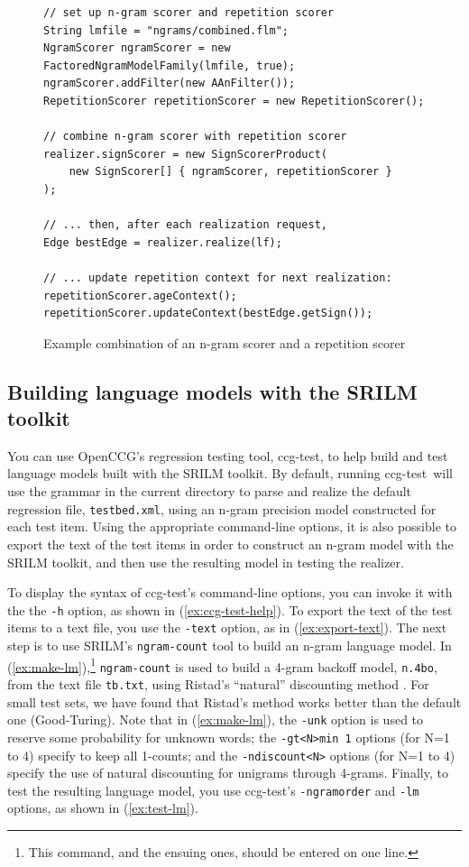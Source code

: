 \documentclass[11pt]{article}
\newcommand{\occg}{OpenCCG}
\newcommand{\ccgtest}{\textsf{ccg-test}}
\newcommand{\code}[1]{\texttt{#1}} %
\newcommand{\eref}[2][]{(\ref{ex:#2}#1)} %
\begin{document}
\begin{figure}%
\begin{center}
\begin{lstlisting}
// set up n-gram scorer and repetition scorer
String lmfile = "ngrams/combined.flm";
NgramScorer ngramScorer = new FactoredNgramModelFamily(lmfile, true);
ngramScorer.addFilter(new AAnFilter());
RepetitionScorer repetitionScorer = new RepetitionScorer();

// combine n-gram scorer with repetition scorer
realizer.signScorer = new SignScorerProduct(
    new SignScorer[] { ngramScorer, repetitionScorer }
);

// ... then, after each realization request, 
Edge bestEdge = realizer.realize(lf);

// ... update repetition context for next realization:
repetitionScorer.ageContext();
repetitionScorer.updateContext(bestEdge.getSign());
\end{lstlisting}
\caption{Example combination of an n-gram scorer and a repetition scorer}
\label{rep-scorer}
\end{center}
\end{figure}

\subsection{Building language models with the SRILM toolkit}
\label{using-srilm}

You can use \occg's regression testing tool, \ccgtest, to help build and
test language models built with the SRILM toolkit. By default, running
\ccgtest\ will use the grammar in the current directory to parse and
realize the default regression file, \code{testbed.xml}, using an n-gram
precision model constructed for each test item. Using the appropriate
command-line options, it is also possible to export the text of the test
items in order to construct an n-gram model with the SRILM toolkit, and
then use the resulting model in testing the realizer.

To display the syntax of \ccgtest's command-line options, you can invoke
it with the the \code{-h} option, as shown in \eref{ccg-test-help}. To
export the text of the test items to a text file, you use the
\code{-text} option, as in \eref{export-text}. The next step is to use
SRILM's \code{ngram-count} tool to build an n-gram language model. In
\eref{make-lm},\footnote{This command, and the ensuing ones, should be
entered on one line.} \code{ngram-count} is used to build a 4-gram
backoff model, \code{n.4bo}, from the text file \code{tb.txt}, using
Ristad's ``natural'' discounting method \cite{Ristad:1995}. For small
test sets, we have found that Ristad's method works better than the
default one (Good-Turing). Note that in \eref{make-lm}, the \code{-unk}
option is used to reserve some probability for unknown words; the
\code{-gt<N>min 1} options (for N=1 to 4) specify to keep all 1-counts;
and the \code{-ndiscount<N>} options (for N=1 to 4) specify the use of
natural discounting for unigrams through 4-grams. Finally, to test the
resulting language model, you use \ccgtest's \code{-ngramorder} and
\code{-lm} options, as shown in \eref{test-lm}.
\end{document}
